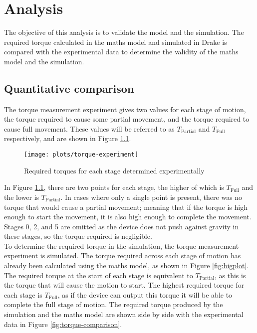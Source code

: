 \chapter{Analysis}

The objective of this analysis is to validate the model and the simulation. The required torque calculated in the maths model and simulated in Drake is compared with the experimental data to determine the validity of the maths model and the simulation.

\section{Quantitative comparison}

The torque measurement experiment gives two values for each stage of motion, the torque required to cause some partial movement, and the torque required to cause full movement. These values will be referred to as $T_\mathrm{Partial}$ and $T_\mathrm{Full}$ respectively, and are shown in Figure \ref{fig:torque-experiment}.\\

\begin{figure}[!h]
	\centering
	\texttt{[image: plots/torque-experiment]}
	\caption{Required torques for each stage determined experimentally}
	\label{fig:torque-experiment}
\end{figure}

In Figure \ref{fig:torque-experiment}, there are two points for each stage, the higher of which is $T_\mathrm{Full}$ and the lower is $T_\mathrm{Partial}$. In cases where only a single point is present, there was no torque that would cause a partial movement; meaning that if the torque is high enough to start the movement, it is also high enough to complete the movement. Stages 0, 2, and 5 are omitted as the device does not push against gravity in these stages, so the torque required is negligible.\\

To determine the required torque in the simulation, the torque measurement experiment is simulated. The torque required across each stage of motion has already been calculated using the maths model, as shown in Figure \ref{fig:bigplot}. The required torque at the start of each stage is equivalent to $T_\mathrm{Partial}$, as this is the torque that will cause the motion to start. The highest required torque for each stage is $T_\mathrm{Full}$, as if the device can output this torque it will be able to complete the full stage of motion. The required torque produced by the simulation and the maths model are shown side by side with the experimental data in Figure \ref{fig:torque-comparison}.\\

